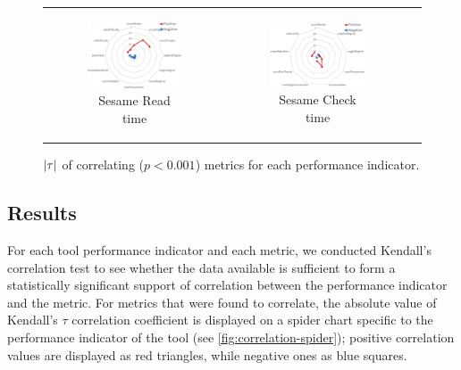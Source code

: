 \begin{figure}[tp]
\begin{center}
\begin{tabular}{c c c}
\begin{subfigure}[t]{0.31\textwidth}
	    \includegraphics[width=0.95\textwidth]{figures/spider-sesame-read.pdf}
	    \caption{Sesame Read time}\end{subfigure} &
	    \begin{subfigure}[t]{0.31\textwidth}\centering
	    \includegraphics[width=0.95\textwidth]{figures/spider-sesame-check.pdf}
	    \caption{Sesame Check time}\end{subfigure} 
    \end{tabular}

  \caption{$|{\tau}|$ of correlating ($p<0.001$) metrics for each performance indicator.}
  \label{fig:correlation-spider}
\end{center}
\end{figure}

\subsection{Results}
For each tool performance indicator and each metric, we conducted Kendall's correlation test to see whether the data available is sufficient to form a statistically significant support of correlation between the performance indicator and the metric. For metrics that were found to correlate, the absolute value of Kendall's $\tau$ correlation coefficient is displayed on a spider chart specific to the performance indicator of the tool (see \autoref{fig:correlation-spider}); positive correlation values are displayed as red triangles, while negative ones as blue squares.  


